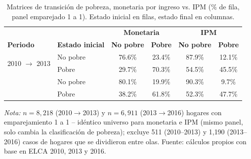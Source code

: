 \begin{table}[H]
  \centering
  \caption{Matrices de transición de pobreza, monetaria por ingreso vs.
  IPM (\% de fila, panel emparejado 1 a 1). Estado inicial en filas,
  estado final en columnas.}
  \label{tab:matriz_transicion}
  \footnotesize
  \begin{tabular}{ll cc cc}
    \toprule
    & & \multicolumn{2}{c}{\textbf{Monetaria}} & \multicolumn{2}{c}{\textbf{IPM}} \\
    \textbf{Periodo} & \textbf{Estado inicial} & \textbf{No pobre} & \textbf{Pobre} & \textbf{No pobre} & \textbf{Pobre} \\
    \midrule
    \multirow{2}{*}{2010 $\rightarrow$ 2013} & No pobre & 76.6\% & 23.4\% & 87.9\% & 12.1\% \\
     & Pobre & 29.7\% & 70.3\% & 54.5\% & 45.5\% \\
    \addlinespace
    \multirow{2}{*}{2013 $\rightarrow$ 2016} & No pobre & 80.1\% & 19.9\% & 90.3\% & 9.7\% \\
     & Pobre & 38.2\% & 61.8\% & 52.3\% & 47.7\% \\
    \bottomrule
  \end{tabular}
  \begin{minipage}{0.95\textwidth}
    \vspace{4pt}
    \footnotesize \textit{Nota:} $n=8{,}218$ (2010$\to$2013) y $n=6{,}911$
    (2013$\to$2016) hogares con emparejamiento 1 a 1 -- idéntico universo para
    monetaria e IPM (mismo panel, solo cambia la clasificación de pobreza);
    excluye 511 (2010--2013) y 1{,}190 (2013--2016) casos de hogares que se
    dividieron entre olas. Fuente: cálculos propios con base en ELCA 2010,
    2013 y 2016.
  \end{minipage}
\end{table}